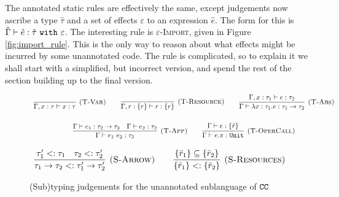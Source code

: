The annotated static rules are effectively the same, except judgements now
ascribe a type $\hat \tau$ and a set of effects $\varepsilon$ to an expression $\hat e$.
The form for this is $\hat \Gamma \vdash \hat e: \hat \tau~ \mathtt{with}~ \varepsilon$.
The interesting rule is \textsc{$\varepsilon$-Import}, given in Figure \ref{fig:import_rule}. This is the only way to reason about what effects might be
incurred by some unannotated code. The rule is complicated, so to explain it we shall
start with a simplified, but incorrect version, and spend the rest of the section building
up to the final version.

\begin{figure}
\vspace{-5pt}


\[
\begin{array}{c}


\infer[\textsc{(T-Var)}]
	{\Gamma, x: \tau \vdash x: \tau}
	{}
\hspace{5ex}
\infer[\textsc{(T-Resource)}]
	{\Gamma, r: \{ r \} \vdash r : \{ r \}}
	{}

\hspace{5ex}
\infer[\textsc{(T-Abs)}]
	{\Gamma \vdash \lambda x: \tau_1.e : \tau_1 \rightarrow \tau_2}
	{\Gamma, x: \tau_1 \vdash e: \tau_2}\\[4ex]
	
\infer[\textsc{(T-App)}]
	{\Gamma \vdash e_1~e_2: \tau_3}
	{\Gamma \vdash e_1: \tau_2 \rightarrow \tau_3 & \Gamma \vdash e_2: \tau_2}
\hspace{5ex}
\infer[\textsc{(T-OperCall)}]
	{\Gamma \vdash e.\pi: \kwa{Unit}}
	{\Gamma \vdash e: \{ \bar r \}}

\end{array}
\]

\fbox{$\tau <: \tau$}

\[
\begin{array}{c}

\infer[\textsc{(S-Arrow)}]
	{ \tau_1 \rightarrow \tau_2 <: \tau_1' \rightarrow \tau_2' }
	{ \tau_1' <: \tau_1 & \tau_2 <: \tau_2' }
\hspace{5ex}
\infer[\textsc{(S-Resources)}]
	{ \{ \bar r_1 \} <: \{ \bar r_2 \} }
	{ \{ \bar r_1 \} \subseteq \{ \bar r_2 \} }

\end{array}
\]

\vspace{-0.3cm}
\caption{(Sub)typing judgements for the unannotated sublanguage of $\mathtt{CC}$}
\vspace{-0.3cm}
\label{fig:unannotated_static_rules}
\end{figure}

